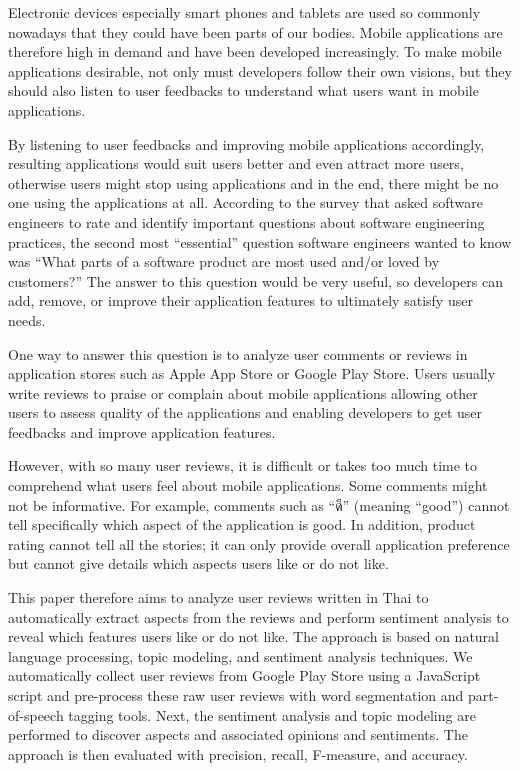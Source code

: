 
Electronic devices especially smart phones and tablets are used so commonly nowadays that they could have been parts of our bodies. Mobile applications are therefore high in demand and have been developed increasingly. To make mobile applications desirable, not only must developers follow their own visions, but they should also listen to user feedbacks to understand what users want in mobile applications.

By listening to user feedbacks and improving mobile applications accordingly, resulting applications would suit users better and even attract more users, otherwise users might stop using applications and in the end, there might be no one using the applications at all. According to the survey \cite{145Q} that asked software engineers to rate and identify important questions about software engineering practices, the second most \enquote{essential} question software engineers wanted to know was \enquote{What parts of a software product are most used and/or loved by customers?} The answer to this question would be very useful, so developers can add, remove, or improve their application features to ultimately satisfy user needs.

One way to answer this question is to analyze user comments or reviews in application stores such as Apple App Store or Google Play Store. Users usually write reviews to praise or complain about mobile applications allowing other users to assess quality of the applications and enabling developers to get user feedbacks and improve application features. 

However, with so many user reviews, it is difficult or takes too much time to comprehend what users feel about mobile applications. Some comments might not be informative. For example, comments such as \enquote{{ดี}} (meaning \enquote{good}) cannot tell specifically which aspect of the application is good. In addition, product rating cannot tell all the stories; it can only provide overall application preference but cannot give details which aspects users like or do not like.

This paper therefore aims to analyze user reviews written in Thai to automatically extract aspects from the reviews and perform sentiment analysis to reveal which features users like or do not like. The approach is based on natural language processing, topic modeling, and sentiment analysis techniques. We automatically collect user reviews from Google Play Store using a JavaScript script and pre-process these raw user reviews with word segmentation and part-of-speech tagging tools. Next, the sentiment analysis and topic modeling are performed to discover aspects and associated opinions and sentiments. The approach is then evaluated with precision, recall, F-measure, and accuracy.

